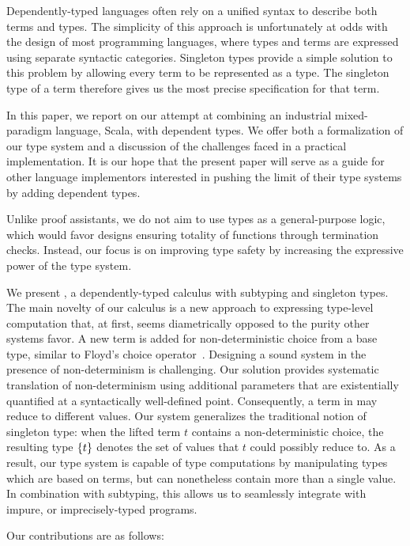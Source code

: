 Dependently-typed languages often rely on a unified syntax to describe both terms and types.
The simplicity of this approach is unfortunately at odds with the design of most programming languages, where types and terms are expressed using separate syntactic categories.
Singleton types provide a simple solution to this problem by allowing every term to be represented as a type.
The singleton type of a term therefore gives us the most precise specification for that term.

In this paper, we report on our attempt at combining an industrial mixed-paradigm language, Scala, with dependent types.
We offer both a formalization of our type system and a discussion of the challenges faced in a practical implementation.
It is our hope that the present paper will serve as a guide for other language implementors interested in pushing the limit of their type systems by adding dependent types.

Unlike proof assistants, we do not aim to use types as a general-purpose logic, which would favor designs ensuring totality of functions through termination checks.
Instead, our focus is on improving type safety by increasing the expressive power of the type system.

We present \oursystem, a dependently-typed calculus with subtyping and singleton types.
The main novelty of our calculus is a new approach to expressing type-level computation that, at first, seems diametrically opposed to the purity other systems favor.
A new term is added for non-deterministic choice from a base type, similar to Floyd's choice operator~\citep{floyd1967nondeterministic}.
Designing a sound system in the presence of non-determinism is challenging.
Our solution provides systematic translation of non-determinism using additional parameters that are existentially quantified at a syntactically well-defined point.
Consequently, a term in \oursystem may reduce to different values.
Our system generalizes the traditional notion of singleton type: when the lifted term $t$ contains a non-deterministic choice, the resulting type $\lbrace t \rbrace$ denotes the set of values that $t$ could possibly reduce to.
As a result, our type system is capable of type computations by manipulating types which are based on terms, but can nonetheless contain more than a single value.
In combination with subtyping, this allows us to seamlessly integrate with impure, or imprecisely-typed programs.

Our contributions are as follows:

